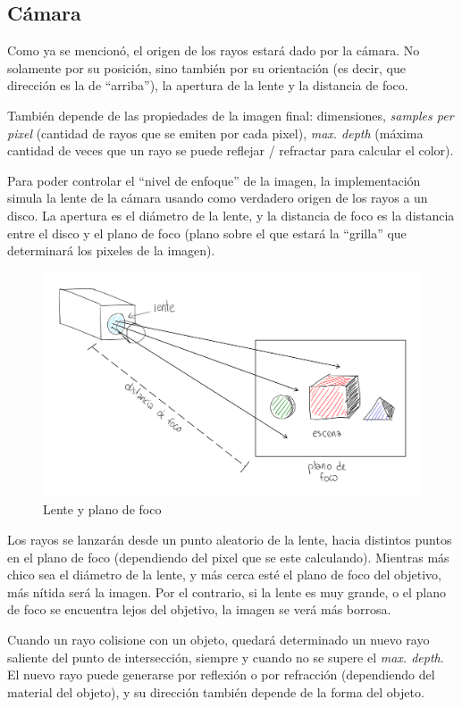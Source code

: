 \subsection{Cámara} \label{ssec:rt-camera}

Como ya se mencionó, el origen de los rayos estará dado por la cámara. No
solamente por su posición, sino también por su orientación (es decir, que
dirección es la de ``arriba''), la apertura de la lente y la distancia de foco.

También depende de las propiedades de la imagen final: dimensiones,
\textit{samples per pixel} (cantidad de rayos que se emiten por cada pixel),
\textit{max. depth} (máxima cantidad de veces que un rayo se puede reflejar /
refractar para calcular el color).

Para poder controlar el ``nivel de enfoque'' de la imagen, la implementación
simula la lente de la cámara usando como verdadero origen de los rayos a un
disco. La apertura es el diámetro de la lente, y la distancia de foco
es la distancia entre el disco y el plano de foco (plano sobre el que estará la
``grilla'' que determinará los pixeles de la imagen).

\begin{figure}
    \centering
    \includegraphics[width=.7\textwidth]{imgs/rt-camera-rays-through-lens.png}
    \caption{Lente y plano de foco}
    \label{fig:rt-camera-plano-foco}
\end{figure}

Los rayos se lanzarán desde un punto aleatorio de la lente, hacia distintos
puntos en el plano de foco (dependiendo del pixel que se este calculando).
Mientras más chico sea el diámetro de la lente, y más cerca esté el plano de
foco del objetivo, más nítida será la imagen. Por el contrario, si la lente es
muy grande, o el plano de foco se encuentra lejos del objetivo, la imagen se
verá más borrosa.

Cuando un rayo colisione con un objeto, quedará determinado un nuevo rayo
saliente del punto de intersección, siempre y cuando no se supere el
\textit{max. depth}. El nuevo rayo puede generarse por reflexión o por
refracción (dependiendo del material del objeto), y su dirección también depende
de la forma del objeto.


